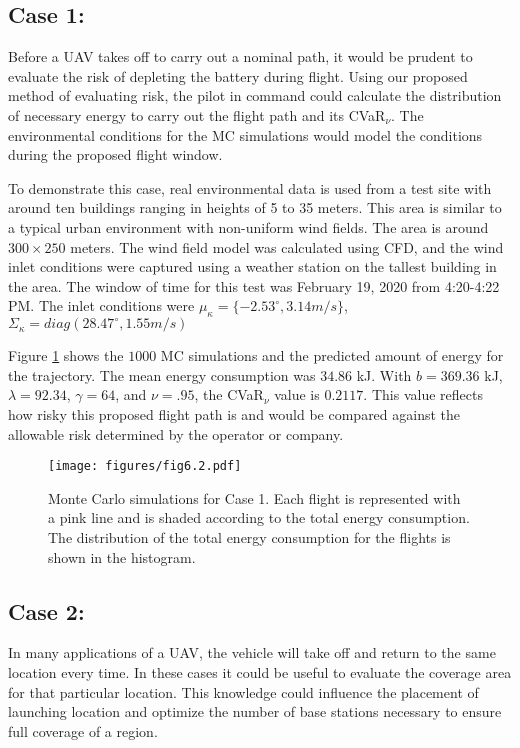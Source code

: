 \documentclass[letterpaper, 10 pt, conference]{ieeeconf}
\begin{document}
\subsection{Case 1: }
Before a UAV takes off to carry out a nominal path, it would be prudent to evaluate the risk of depleting the battery during flight. Using our proposed method of evaluating risk, the pilot in command could calculate the distribution of necessary energy to carry out the flight path and its CVaR$_{\nu}$. The environmental conditions for the MC simulations would model the conditions during the proposed flight window.

To demonstrate this case, real environmental data is used from a test site with around ten buildings ranging in heights of 5 to 35 meters. This area is similar to a typical urban environment with non-uniform wind fields. The area is around $300 \times 250$ meters. The wind field model was calculated using CFD, and the wind inlet conditions were captured using a weather station on the tallest building in the area. The window of time for this test was February 19, 2020 from 4:20-4:22 PM. The inlet conditions were $\mu_{\kappa} = \{-2.53^\circ,3.14 m/s\}$, $\Sigma_{\kappa}  = diag(28.47^\circ, 1.55 m/s) $




Figure \ref{fig:study1} shows the $1000$ MC simulations and the predicted amount of energy for the trajectory. The mean energy consumption was $34.86$ kJ. With $b=369.36$ kJ, $\lambda=92.34$, $\gamma=64$, and $\nu=.95$, the CVaR$_{\nu}$ value is $0.2117$. This value reflects how risky this proposed flight path is and would be compared against the allowable risk determined by the operator or company.





\begin{figure}
    \centering
      \texttt{[image: figures/fig6.2.pdf]}
\caption{Monte Carlo simulations for Case 1. Each flight is represented with a pink line and is shaded according to the total energy consumption. The distribution of the total energy consumption for the flights is shown in the histogram.}
    \label{fig:study1}
\end{figure}
\subsection{Case 2: }
In many applications of a UAV, the vehicle will take off and return to the same location every time. In these cases it could be useful to evaluate the coverage area for that particular location. This knowledge could influence the placement of launching location and optimize the number of base stations necessary to ensure full coverage of a region.
\end{document}

